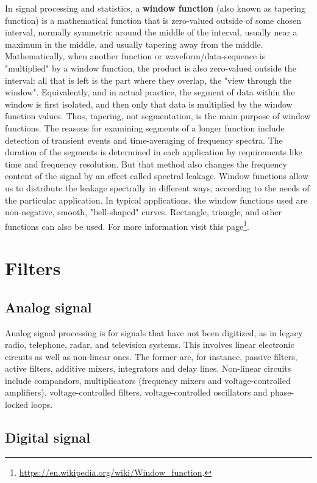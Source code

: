 \documentclass[12pt]{article}
\theoremstyle{plain}
\begin{document}
In signal processing and statistics, a \textbf{window function} (also known as tapering function) is a mathematical function that is zero-valued outside of some chosen interval, normally symmetric around the middle of the interval, usually near a maximum in the middle, and usually tapering away from the middle. Mathematically, when another function or waveform/data-sequence is "multiplied" by a window function, the product is also zero-valued outside the interval: all that is left is the part where they overlap, the "view through the window". Equivalently, and in actual practice, the segment of data within the window is first isolated, and then only that data is multiplied by the window function values. Thus, tapering, not segmentation, is the main purpose of window functions. The reasons for examining segments of a longer function include detection of transient events and time-averaging of frequency spectra. The duration of the segments is determined in each application by requirements like time and frequency resolution. But that method also changes the frequency content of the signal by an effect called spectral leakage. Window functions allow us to distribute the leakage spectrally in different ways, according to the needs of the particular application. In typical applications, the window functions used are non-negative, smooth, "bell-shaped" curves. Rectangle, triangle, and other functions can also be used. For more information visit this page\footnote{\url{https://en.wikipedia.org/wiki/Window_function}.}.

\section{Filters}


\subsection{Analog signal}

Analog signal processing is for signals that have not been digitized, as in legacy radio, telephone, radar, and television systems. This involves linear electronic circuits as well as non-linear ones. The former are, for instance, passive filters, active filters, additive mixers, integrators and delay lines. Non-linear circuits include compandors, multiplicators (frequency mixers and voltage-controlled amplifiers), voltage-controlled filters, voltage-controlled oscillators and phase-locked loops.


\subsection{Digital signal}
\end{document}
